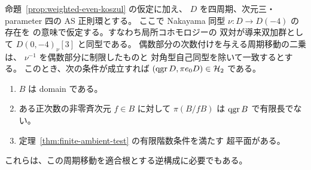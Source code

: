 \begin{proposition}[残る許容条件への還元]
\label{prop:weighted-inverse-reduction}
命題~\ref{prop:weighted-even-koszul} の仮定に加え、
$D$ を四周期、次元三・parameter 四の AS 正則環とする。
ここで Nakayama 同型 $\nu:D\to D(-4)$ の存在を
\cite[Definition 4.15]{MN2025} の意味で仮定する。すなわち局所コホモロジーの
双対が導来双加群として $D(0,-4)_\nu[3]$ と同型である。
偶数部分の次数付けを与える周期移動の二乗は、
$\nu^{-1}$ を偶数部分に制限したものと
対角型自己同型を除いて一致するとする。
このとき、次の条件が成立すれば $(\operatorname{qgr} D,\pi e_0D)\in\mathcal H_2$ である。
\begin{enumerate}
\item $B$ は domain である。
\item ある正次数の非零斉次元 $f\in B$ に対して
$\pi(B/fB)$ は $\operatorname{qgr} B$ で有限長でない。
\item 定理~\ref{thm:finite-ambient-test} の有限階数条件を満たす
超平面がある。
\end{enumerate}
これらは、この周期移動を適合根とする逆構成に必要でもある。
\end{proposition}


